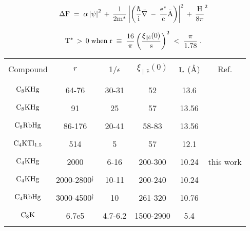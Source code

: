 {\newpage
\clearpage
\samepage \begin{equation}%
\label{deltaf}
\rm \Delta F \;  =  \; \alpha \left| \psi \right|^2 \, + \,
\frac{1}{2m^*}\left| \left( \frac{\hbar}{i}\vec{\nabla} \: - \:
\frac{e^*}{c}\vec{A} \right) \right|^2 \, + \, \frac{H}{8\pi}^2
\end{equation}
}

{\newpage
\clearpage
\samepage \begin{figure}\vspace{6.5in}

\label{klbfig} 
\end{figure}
}

{\newpage
\clearpage
\samepage \begin{equation}\label{klbparam}
\rm T^* \, > \, 0 \; when \; r \; \equiv \; \frac{16}{\pi} \left( \frac{\xi_{\parallel \hat{c}}(0)}{s}
\right)^2  \; < \; \frac{\pi}{1.78} \; .
\end{equation}
}

{\newpage
\clearpage
\samepage \dag
}

{\newpage
\clearpage
\samepage \begin{table}
\label{klbgics}
\begin{center}
\begin{tabular}{|c|ccccc|}
\hline
& & & & & \\ 
Compound & $r$ & 1/$\epsilon$ & $\xi_{\parallel \hat{c}}(0)$ & $\rm I_c$ (\AA) & Ref.\\ 
& & & & & \\ 
\hline
& & & & & \\ 
$\rm C_8KHg$ & 64-76& 30-31& 52 & 13.6  & \cite{koike81,tanuma81} \\ 
& & & & & \\ 
$\rm C_8KHg$ & 91& 25& 57 & 13.56  & \cite{pendrys83} \\ 
& & & & & \\ 
$\rm C_8RbHg$ & 86-176& 20-41& 58-83 & 13.56  & \cite{iye82} \\ 
& & & & & \\ 
$\rm C_4KTl_{1.5}$ & 514& 5 &57 & 12.1 & \cite{pendrys83,vogel81} \\ 
& & & & & \\ 
$\rm C_4KHg$ & 2000& 6-16& 200-300 & 10.24  & this work \\ 
& & & & & \\ 
$\rm C_4KHg$ & 2000-2800$^{\dagger}$& 10-11& 200-240 & 10.24  & \cite{iye83} \\ 
& & & & & \\ 
$\rm C_4RbHg$ & 3000-4500$^{\dagger}$& 10& 261-320 & 10.76  & \cite{iye82} \\ 
& & & & & \\ 
$\rm C_8K$ & 6.7e5& 4.7-6.2 & 1500-2900& 5.4  & \cite{koike81,koike80} \\ 
& & & & & \\ 
\hline
\end{tabular}
\end{center}
\end{table}
}

